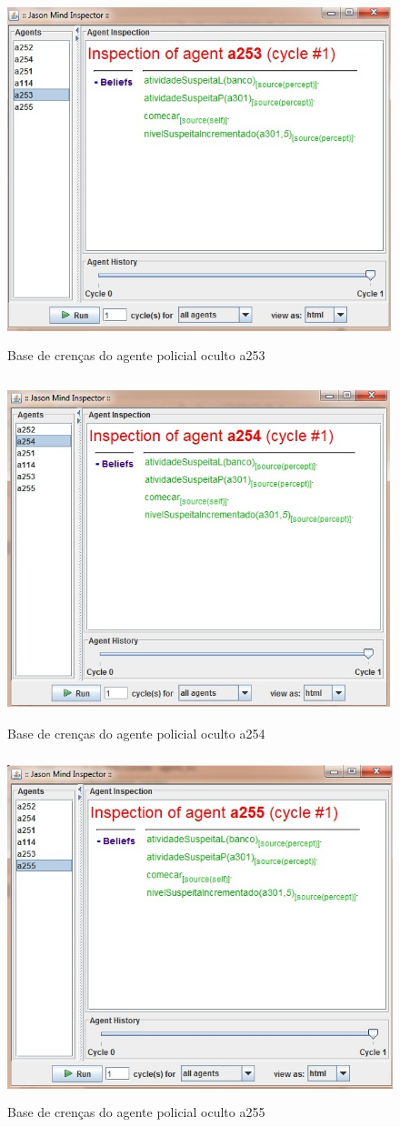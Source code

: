 \begin{figure}
\centering
\includegraphics [height=10cm]{figuras/crencas_policial253.jpg}
\caption{Base de crenças do agente policial oculto a253}
\label{baseA253}
\end{figure}
\begin{figure}
\centering
\includegraphics [height=10cm]{figuras/crencas_policial254.jpg}
\caption{Base de crenças do agente policial oculto a254}
\label{baseA254}
\end{figure}
\begin{figure}
\centering
\includegraphics [height=10cm]{figuras/crencas_policial255.jpg}
\caption{Base de crenças do agente policial oculto a255}
\label{baseA255}
\end{figure}


